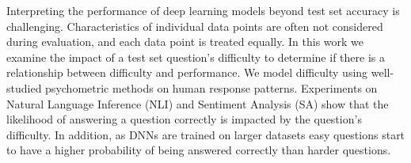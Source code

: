 Interpreting the performance of deep learning models beyond test set accuracy is challenging. Characteristics of individual data points are often not considered during evaluation, and each data point is treated equally. In this work we examine the impact of a test set question's difficulty to determine if there is a relationship between difficulty and performance. We model difficulty using well-studied psychometric methods on human response patterns. Experiments on Natural Language Inference (NLI) and Sentiment Analysis (SA) show that the likelihood of answering a question correctly is impacted by the question's difficulty. In addition, as DNNs are trained on larger datasets easy questions start to have a higher probability of being answered correctly than harder questions.

